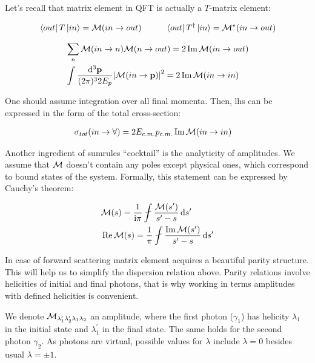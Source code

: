 Let's recall that matrix element in QFT is actually a $T$-matrix element:

\begin{align}
    & \bra{out} T \ket{in} = \mathcal{M}(in \rightarrow out) \qquad &\bra{out} T^\dag \ket{in} = \mathcal{M}^\star(in \rightarrow out)
\end{align}

\begin{align}
        & \sum_{n} \mathcal{M}(in \rightarrow n)  \mathcal{M}(n \rightarrow out) = 2 \Im \mathcal{M}(in \rightarrow out) \\
        & \int \frac{\dd^3 \mathbf{p}}{(2 \pi)^3 2 E_p} \abs{\mathcal{M}(in \rightarrow \mathbf{p})}^2 = 2 \Im \mathcal{M}(in \rightarrow in)
\end{align}

One should assume integration over all final momenta. Then, lhs can be expressed in the form of the total cross-section:

\begin{align}
    & \sigma_{tot}(in \rightarrow \forall) = 2 E_{c.m.} p_{c.m.} \Im \mathcal{M}(in \rightarrow in) \label{eq:optical-th}
\end{align}

Another ingredient of sumrules ``cocktail'' is the analyticity of amplitudes. We assume that $\mathcal{M}$ doesn't contain any poles except physical ones, which correspond to bound states of the system. Formally, this statement can be expressed by Cauchy's theorem:

\begin{align}
    & \Mcal(s) = \frac{1}{\ii \pi} \fint \frac{\Mcal(s^\prime)}{s^\prime - s} \dd{s^\prime} \\
    & \Re \Mcal(s) = \frac{1}{\pi} \fint \frac{\Im \Mcal(s^\prime)}{s^\prime - s} \dd{s^\prime} \label{eq:disp-rel-gen}
\end{align}

In case of forward scattering matrix element acquires a beautiful parity structure. This will help us to simplify the dispersion relation above. Parity relations involve helicities of initial and final photons, that is why working in terms amplitudes with defined helicities is convenient.

We denote $\mathcal{M}_{\lambda^\prime_1 \lambda^\prime_2 \lambda_1 \lambda_2}$ an amplitude, where the first photon ($\gamma_1$) has helicity $\lambda_1$ in the initial state and $\lambda_1^\prime$ in the final state. The same holds for the second photon $\gamma_2$. As photons are virtual, possible values for $\lambda$ include $\lambda=0$ besides usual $\lambda=\pm1$.

